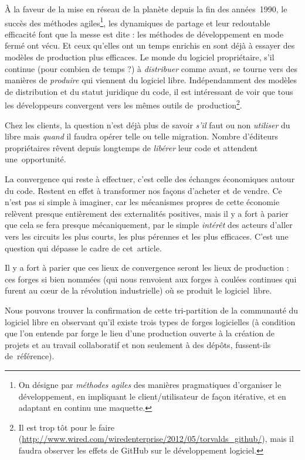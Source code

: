 \documentclass{FramateX}
\begin{document}
\begin{refsection}
À la faveur de la mise en réseau de la planète depuis la fin des
années~1990, le succès des méthodes agiles\footnote{On désigne par
\textit{méthodes agiles} des manières pragmatiques d'organiser le
développement, en impliquant le client/utilisateur de façon itérative,
et en adaptant en continu une maquette.}, les dynamiques de partage et
leur redoutable efficacité font que la messe est dite : les méthodes de
développement en mode fermé ont vécu. Et ceux qu'elles ont un temps
enrichis en sont déjà à essayer des modèles de production plus
efficaces. Le monde du logiciel propriétaire, s'il continue (pour
combien de temps ?) à \textit{distribuer} comme avant, se tourne vers
des manières de \textit{produire} qui viennent du logiciel libre.
Indépendamment des modèles de distribution et du statut juridique du
code, il est intéressant de voir que tous les développeurs convergent
vers les mêmes outils de~production\footnote{Il est trop tôt pour le
faire
(\url{http://www.wired.com/wiredenterprise/2012/05/torvalds_github/}),
mais il faudra observer les effets de GitHub sur le développement
logiciel.}.

Chez les clients, la question n'est déjà plus de savoir \textit{s'il}
faut ou non \textit{utiliser} du libre mais \textit{quand} il faudra
opérer telle ou telle migration. Nombre d'éditeurs propriétaires rêvent
depuis longtemps de \textit{libérer} leur code et attendent
une~opportunité.

La convergence qui reste à effectuer, c'est celle des échanges
économiques autour du code. Restent en effet à transformer nos façons
d'acheter et de vendre. Ce n'est pas si simple à imaginer, car les
mécanismes propres de cette économie relèvent presque entièrement des
externalités positives, mais il y a fort à parier que cela se fera
presque mécaniquement, par le simple \textit{intérêt} des acteurs
d'aller vers les circuits les plus courts, les plus pérennes et les
plus efficaces. C'est une question qui dépasse le cadre de cet~article.

Il y a fort à parier que ces lieux de convergence seront les lieux de
production : ces forges si bien nommées (qui nous renvoient aux forges
à coulées continues qui furent au cœur de la révolution industrielle)
où se produit le logiciel~libre.

Nous pouvons trouver la confirmation de cette tri-partition de la
communauté du logiciel libre en observant qu'il existe trois types de
forges logicielles (à condition que l'on entende par forge le lieu
d'une production ouverte à la création de projets et au travail
collaboratif et non seulement à des dépôts, fussent-ils de~référence).


\end{refsection}
\end{document}
